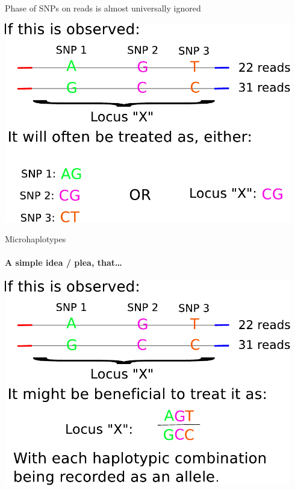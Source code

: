 \documentclass[letter,graphicx]{beamer}
\begin{document}
\begin{frame}{Phase of SNPs on reads is almost universally ignored}
\begin{center}
\includegraphics[width=0.94\textwidth]{mhap_figs/three-snp-reads.pdf}
\end{center}
\end{frame}













\begin{frame}{Microhaplotypes}
\framesubtitle{A simple idea / plea, that\ldots}
\begin{center}
\includegraphics[width=0.94\textwidth]{mhap_figs/three-snp-reads-mhap.pdf}
\end{center}
\end{frame}
\end{document}
